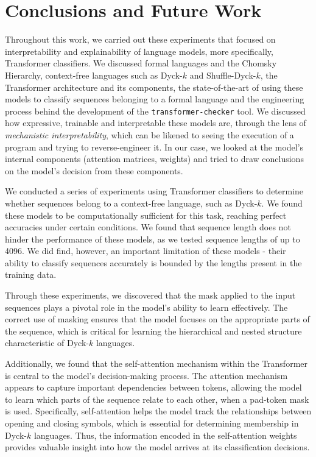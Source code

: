 \chapter{Conclusions and Future Work}

Throughout this work, we carried out these experiments that focused on interpretability and explainability of language models, more specifically, Transformer classifiers. We discussed formal languages and the Chomsky Hierarchy, context-free languages such as Dyck-$k$ and Shuffle-Dyck-$k$, the Transformer architecture and its components, the state-of-the-art of using these models to classify sequences belonging to a formal language and the engineering process behind the development of the \verb|transformer-checker| tool. We discussed how expressive, trainable and interpretable these models are, through the lens of \emph{mechanistic interpretability}, which can be likened to seeing the execution of a program and trying to reverse-engineer it. In our case, we looked at the model's internal components (attention matrices, weights) and tried to draw conclusions on the model's decision from these components. 

We conducted a series of experiments using Transformer classifiers to determine whether sequences belong to a context-free language, such as Dyck-$k$. We found these models to be computationally sufficient for this task, reaching perfect accuracies under certain conditions. We found that sequence length does not hinder the performance of these models, as we tested sequence lengths of up to 4096. We did find, however, an important limitation of these models - their ability to classify sequences accurately is bounded by the lengths present in the training data.

Through these experiments, we discovered that the mask applied to the input sequences plays a pivotal role in the model's ability to learn effectively. The correct use of masking ensures that the model focuses on the appropriate parts of the sequence, which is critical for learning the hierarchical and nested structure characteristic of Dyck-$k$ languages. 

Additionally, we found that the self-attention mechanism within the Transformer is central to the model's decision-making process. The attention mechanism appears to capture important dependencies between tokens, allowing the model to learn which parts of the sequence relate to each other, when a pad-token mask is used. Specifically, self-attention helps the model track the relationships between opening and closing symbols, which is essential for determining membership in Dyck-$k$ languages. Thus, the information encoded in the self-attention weights provides valuable insight into how the model arrives at its classification decisions. 

